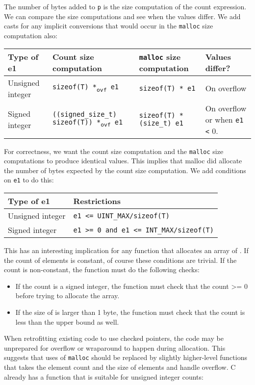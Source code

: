 The number of bytes added to \texttt{p} is the size computation of the
count expression. We can compare the size computations and see when the
values differ. We add casts for any implicit conversions that would
occur in the \texttt{malloc} size computation also:

\begin{longtable}[c]{lp{1.75in}p{1.75in}p{1in}}
\toprule
Type of e1 & Count size computation & \texttt{malloc} size computation &
Values differ?\tabularnewline
\midrule
\endhead
Unsigned integer & \texttt{sizeof(T) *\textsubscript{ovf} e1} &
\texttt{sizeof(T) * e1} & On overflow\tabularnewline
Signed integer & \texttt{((signed\_size\_t) sizeof(T))
*\textsubscript{ovf} e1} & \texttt{sizeof(T) * (size\_t) e1} & On
overflow or when \texttt{e1 <} 0.\tabularnewline
\bottomrule
\end{longtable}

For correctness, we want the count size computation and the
\texttt{malloc} size computations to produce identical values. This
implies that malloc did allocate the number of bytes expected by the
count size computation. We add conditions on \texttt{e1} to do this:

\begin{longtable}[c]{ll}
\toprule
Type of e1 & Restrictions\tabularnewline
\midrule
\endhead
Unsigned integer & \texttt{e1 <= UINT\_MAX/sizeof(T)}\tabularnewline
Signed integer & \texttt{e1 >= 0 and e1 <= INT\_MAX/sizeof(T)}\tabularnewline
\bottomrule
\end{longtable}

This has an interesting implication for any function that allocates an
array of . If the count of elements is constant, of course these
conditions are trivial. If the count is non-constant, the function
must do the following checks:

\begin{itemize}
\item
  If the count is a signed integer, the function must check that the
  count \textgreater{}= 0 before trying to allocate the array.
\item
  If the size of  is larger than 1 byte, the function must check that the
  count is less than the upper bound as well.
\end{itemize}

When retrofitting existing code to use checked pointers, the code may be
unprepared for overflow or wraparound to happen during allocation. This
suggests that uses of \texttt{malloc} should be replaced by slightly
higher-level functions that takes the element count and the size of
elements and handle overflow. C already has a function that is suitable
for unsigned integer counts:

